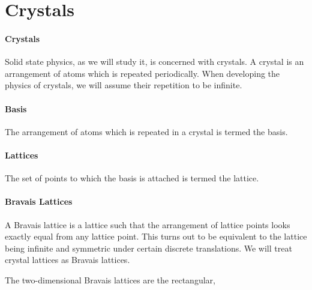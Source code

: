 \section{Crystals}

\paragraph{Crystals}
Solid state physics, as we will study it, is concerned with crystals. A crystal is an arrangement of atoms which is repeated periodically. When developing the physics of crystals, we will assume their repetition to be infinite.

\paragraph{Basis}
The arrangement of atoms which is repeated in a crystal is termed the basis.

\paragraph{Lattices}
The set of points to which the basis is attached is termed the lattice.

\paragraph{Bravais Lattices}
A Bravais lattice is a lattice such that the arrangement of lattice points looks exactly equal from any lattice point. This turns out to be equivalent to the lattice being infinite and symmetric under certain discrete translations. We will treat crystal lattices as Bravais lattices.

The two-dimensional Bravais lattices are the rectangular,

\begin{figure}[!ht]
	\centering
	\hfil
\end{figure}

